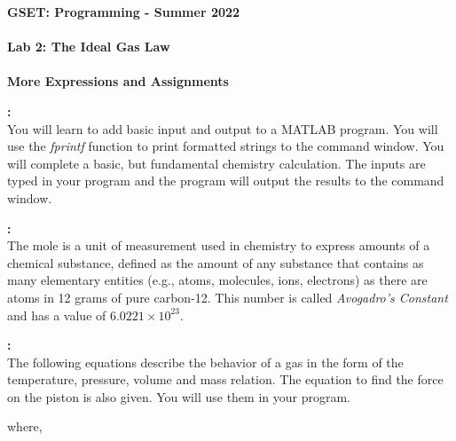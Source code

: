 \documentclass[11pt]{article}
\newcommand{\secNum}{GSET: Programming}
\newcommand{\assnType}{Lab}
\newcommand{\assnTitle}{The Ideal Gas Law}
\newcommand{\assnNum}{2}
\newcommand{\currTerm}{Summer 2022}
\begin{document}
	\textbf{\LARGE \secNum \hspace{1mm} - \hspace{1mm} \currTerm} \\\\
    \textbf{\LARGE \assnType \hspace{1mm}  \assnNum : \assnTitle} \\\\
    \textbf{More Expressions and Assignments}\\
	
	
	\begin{description}
        \vspace{3mm}
		\item [\textbf{ \Large Overview}] \textbf{ \Large :}\\
			You will learn to add basic input and output to a MATLAB program. You will use the {\it fprintf} function to print formatted strings to the command window. You will complete a basic, but fundamental chemistry calculation. The inputs are typed in your program and the program will output the results to the command window. \\
 
        \item [\textbf{ \Large What is a Mole?}] \textbf{ \Large :}\\   
            The mole is a unit of measurement used in chemistry to express amounts of a chemical substance, defined as the amount of any substance that contains as many elementary entities (e.g., atoms, molecules, ions, electrons) as there are atoms in 12 grams of pure carbon-12. This number is called {\it Avogadro's Constant} and has a value of $6.0221\times10^{23}$. \\
            
 \item [\textbf{ \Large The Ideal Gas Law}] \textbf{ \Large :}\\  
            The following equations describe the behavior of a gas in the form of the temperature, pressure, volume and mass relation. The equation to find the force on the piston is also given. You will use them in your program. \\

                \hspace{15mm}     \hspace{15mm}  
                                 
            
            where,\\
            

\end{description}
\end{document}
